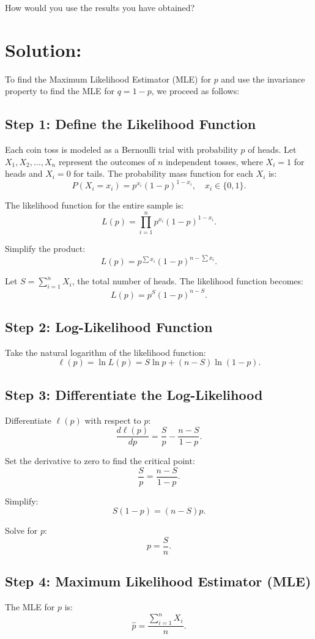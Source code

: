 \documentclass{article}
\begin{document}
How would you use the results you have obtained?

\section*{Solution:}

To find the Maximum Likelihood Estimator (MLE) for $p$ and use the invariance property to find the MLE for $q = 1 - p$, we proceed as follows:

\subsection*{Step 1: Define the Likelihood Function}
Each coin toss is modeled as a Bernoulli trial with probability $p$ of heads. Let $X_1, X_2, \dots, X_n$ represent the outcomes of $n$ independent tosses, where $X_i = 1$ for heads and $X_i = 0$ for tails. The probability mass function for each $X_i$ is:
\[
P(X_i = x_i) = p^{x_i}(1-p)^{1-x_i}, \quad x_i \in \{0, 1\}.
\]

The likelihood function for the entire sample is:
\[
L(p) = \prod_{i=1}^n p^{x_i}(1-p)^{1-x_i}.
\]

Simplify the product:
\[
L(p) = p^{\sum x_i}(1-p)^{n - \sum x_i}.
\]

Let $S = \sum_{i=1}^n X_i$, the total number of heads. The likelihood function becomes:
\[
L(p) = p^S(1-p)^{n-S}.
\]

\subsection*{Step 2: Log-Likelihood Function}
Take the natural logarithm of the likelihood function:
\[
\ell(p) = \ln L(p) = S \ln p + (n-S) \ln(1-p).
\]

\subsection*{Step 3: Differentiate the Log-Likelihood}
Differentiate $\ell(p)$ with respect to $p$:
\[
\frac{d\ell(p)}{dp} = \frac{S}{p} - \frac{n-S}{1-p}.
\]

Set the derivative to zero to find the critical point:
\[
\frac{S}{p} = \frac{n-S}{1-p}.
\]

Simplify:
\[
S(1-p) = (n-S)p.
\]

Solve for $p$:
\[
p = \frac{S}{n}.
\]

\subsection*{Step 4: Maximum Likelihood Estimator (MLE)}
The MLE for $p$ is:
\[
\hat{p} = \frac{\sum_{i=1}^n X_i}{n}.
\]
\end{document}

